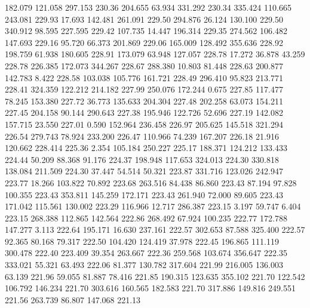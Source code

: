  182.079  121.058  297.153       230.36
 204.655   63.934  331.292       230.34
 335.424  110.665  243.081       229.93
  17.693  142.481  261.091       229.50
 294.876   26.124  130.100       229.50
 340.912   98.595  227.595       229.42
 107.735   14.447  196.314       229.35
 274.562  106.482  147.693       229.16
  95.720   66.373  201.869       229.06
 165.009  128.492  355.636       228.92
 198.759   61.938  180.605       228.91
 173.079   63.948  127.057       228.78
  17.272   36.878   43.259       228.78
 226.385  172.073  344.267       228.67
 288.380   10.803   81.448       228.63
 200.877  142.783    8.422       228.58
 103.038  105.776  161.721       228.49
 296.410   95.823  213.771       228.41
 324.359  122.212  214.182       227.99
 250.076  172.244    0.675       227.85
 117.477   78.245  153.380       227.72
  36.773  135.633  204.304       227.48
 202.258   63.073  154.211       227.45
 204.158   90.144  290.643       227.38
 195.946  122.726   52.696       227.19
 142.082  157.715   23.550       227.01
   0.590  152.964  236.458       226.97
 205.625  145.518  321.294       226.54
 279.743   78.924  233.200       226.47
 110.966   74.239  167.207       226.18
  21.916  120.662  228.414       225.36
   2.354  105.184  250.227       225.17
 188.371  124.212  133.433       224.44
  50.209   88.368   91.176       224.37
 198.948  117.653  324.013       224.30
 330.818  138.084  211.509       224.30
  37.447   54.514   50.321       223.87
 331.716  123.026  242.947       223.77
  18.266  103.822   70.892       223.68
 263.516   84.438   86.860       223.43
  87.194   97.828  100.355       223.43
 353.811  145.259  172.171       223.43
 261.940   72.000   89.605       223.43
 171.042  115.561  130.002       223.29
 116.966   12.717  286.387       223.15
   3.197   59.747    6.404       223.15
 268.388  112.865  142.564       222.86
 268.492   67.924  100.235       222.77
 172.788  147.277    3.113       222.64
 195.171   16.630  237.161       222.57
 302.653   87.588  325.400       222.57
  92.365   80.168   79.317       222.50
 104.420  124.419   37.978       222.45
 196.865  111.119  300.478       222.40
 223.409   39.354  263.667       222.36
 259.568  103.674  356.647       222.35
 333.021   55.321   63.493       222.06
  81.377  130.782  317.604       221.99
 216.005  136.003   63.139       221.96
  59.055   81.887   78.416       221.85
 190.315  123.635  355.102       221.70
 122.542  106.792  146.234       221.70
 303.616  160.565  182.583       221.70
 317.886  149.816  249.551       221.56
 263.739   86.807  147.068       221.13

